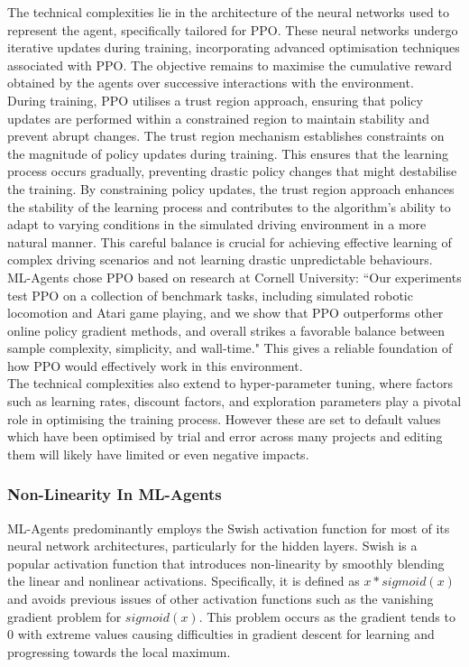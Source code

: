 \documentclass{article}
\begin{document}
 The technical complexities lie in the architecture of the neural networks used to represent the agent, specifically tailored for PPO. These neural networks undergo iterative updates during training, incorporating advanced optimisation techniques associated with PPO. The objective remains to maximise the cumulative reward obtained by the agents over successive interactions with the environment.\\

 During training, PPO utilises a trust region approach, ensuring that policy updates are performed within a constrained region to maintain stability and prevent abrupt changes. The trust region mechanism establishes constraints on the magnitude of policy updates during training. This ensures that the learning process occurs gradually, preventing drastic policy changes that might destabilise the training. By constraining policy updates, the trust region approach enhances the stability of the learning process and contributes to the algorithm's ability to adapt to varying conditions in the simulated driving environment in a more natural manner. This careful balance is crucial for achieving effective learning of complex driving scenarios and not learning drastic unpredictable behaviours.\\

 ML-Agents chose PPO based on research at Cornell University: ``Our experiments test PPO on a collection of benchmark tasks, including simulated robotic locomotion and Atari game playing, and we show that PPO outperforms other online policy gradient methods, and overall strikes a favorable balance between sample complexity, simplicity, and wall-time." \cite{PPO-Algorithms} This gives a reliable foundation of how PPO would effectively work in this environment.\\

 The technical complexities also extend to hyper-parameter tuning, where factors such as learning rates, discount factors, and exploration parameters play a pivotal role in optimising the training process. However these are set to default values which have been optimised by trial and error across many projects and editing them will likely have limited or even negative impacts.

\subsubsection{Non-Linearity In ML-Agents}
ML-Agents predominantly employs the Swish activation function for most of its neural network architectures, particularly for the hidden layers. Swish is a popular activation function that introduces non-linearity by smoothly blending the linear and nonlinear activations. Specifically, it is defined as $x*sigmoid(x)$ and avoids previous issues of other activation functions such as the vanishing gradient problem for $sigmoid(x)$. This problem occurs as the gradient tends to 0 with extreme values causing difficulties in gradient descent for learning and progressing towards the local maximum.\\ 
\end{document}

